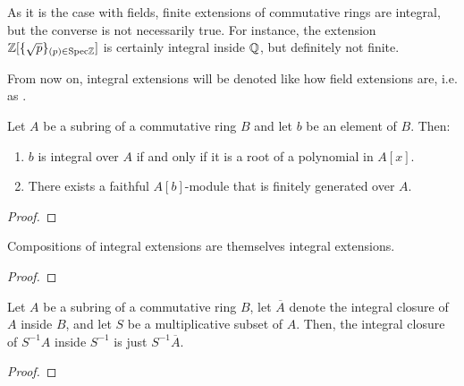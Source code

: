                 \begin{remark} \label{remark: finite_implies_integral}
                    As it is the case with fields, finite extensions of commutative rings are integral, but the converse is not necessarily true. For instance, the extension $\mathbb{Z}[\{\sqrt{p}\}_{(p) \in \mathrm{Spec} \mathbb{Z}}]$ is certainly integral inside $\mathbb{Q}$, but definitely not finite. 
                \end{remark}
                \begin{convention}
                    From now on, integral extensions will be denoted like how field extensions are, i.e. as .
                \end{convention}
                
                \begin{proposition}
                    Let $A$ be a subring of a commutative ring $B$ and let $b$ be an element of $B$. Then:
                        \begin{enumerate}
                            \item $b$ is integral over $A$ if and only if it is a root of a polynomial in $A[x]$. 
                            \item There exists a faithful $A[b]$-module that is finitely generated over $A$. 
                        \end{enumerate}
                \end{proposition}
                    \begin{proof}
                                    
                    \end{proof}
                
                \begin{proposition}
                    Compositions of integral extensions are themselves integral extensions. 
                \end{proposition}
                    \begin{proof}
                                    
                    \end{proof}
                
                \begin{proposition}
                    Let $A$ be a subring of a commutative ring $B$, let $\overline{A}$ denote the integral closure of $A$ inside $B$, and let $S$ be a multiplicative subset of $A$. Then, the integral closure of $S^{-1}A$ inside $S^{-1}$ is just $S^{-1}\overline{A}$. 
                \end{proposition}
                    \begin{proof}
                                    
                    \end{proof}
                
